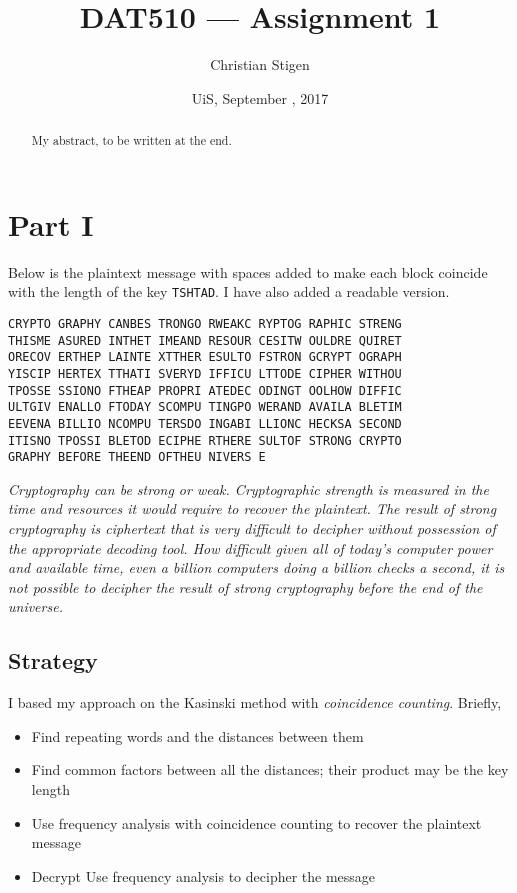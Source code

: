 \documentclass[a4paper,english,12pt]{article}
\title{DAT510 --- Assignment 1}
\author{Christian Stigen}
\date{UiS, September \nth{18}, 2017}
\begin{document}
\maketitle

\begin{abstract}
My abstract, to be written at the end.
\end{abstract}

\section{Part I}

Below is the plaintext message with spaces added to make each block coincide
with the length of the key \texttt{TSHTAD}. I have also added a readable
version.

\begin{verbatim}
CRYPTO GRAPHY CANBES TRONGO RWEAKC RYPTOG RAPHIC STRENG
THISME ASURED INTHET IMEAND RESOUR CESITW OULDRE QUIRET
ORECOV ERTHEP LAINTE XTTHER ESULTO FSTRON GCRYPT OGRAPH
YISCIP HERTEX TTHATI SVERYD IFFICU LTTODE CIPHER WITHOU
TPOSSE SSIONO FTHEAP PROPRI ATEDEC ODINGT OOLHOW DIFFIC
ULTGIV ENALLO FTODAY SCOMPU TINGPO WERAND AVAILA BLETIM
EEVENA BILLIO NCOMPU TERSDO INGABI LLIONC HECKSA SECOND
ITISNO TPOSSI BLETOD ECIPHE RTHERE SULTOF STRONG CRYPTO
GRAPHY BEFORE THEEND OFTHEU NIVERS E
\end{verbatim}

\textit{Cryptography can be strong or weak. Cryptographic strength is measured
in the time and resources it would require to recover the plaintext.  The
result of strong cryptography is ciphertext that is very difficult to decipher
without possession of the appropriate decoding tool. How difficult given all of
today's computer power and available time, even a billion computers doing a
billion checks a second, it is not possible to decipher the result of strong
cryptography before the end of the universe.}

\subsection{Strategy}

I based my approach on the Kasinski method with \textit{coincidence counting}. Briefly,

\begin{itemize}
  \item Find repeating words and the distances between them
  \item Find common factors between all the distances; their product may be the
    key length
  \item Use frequency analysis with coincidence counting to recover the
    plaintext message
  \item Decrypt Use frequency analysis to decipher the message
\end{itemize}
\end{document}

